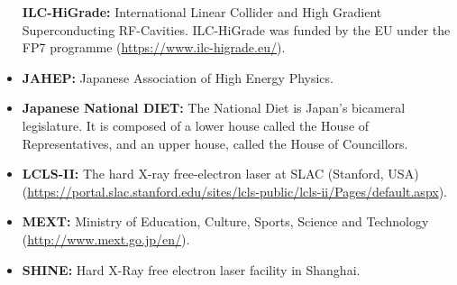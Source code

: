 \documentclass[%
 reprint,
 floatfix,
 amsmath,amssymb,
 aps,
]{revtex4-1}
\begin{document}
\begin{itemize}
\textbf{ILC-HiGrade:} International Linear Collider and High Gradient Superconducting RF-Cavities. ILC-HiGrade was funded by the EU under the FP7 programme (\url{https://www.ilc-higrade.eu/}).
\item
\textbf{JAHEP:} Japanese Association of High Energy Physics.
\item
\textbf{Japanese National DIET:} The National Diet is Japan's bicameral legislature. It is composed of a lower house called the House of Representatives, and an upper house, called the House of Councillors.
\item
\textbf{LCLS-II:}  The hard X-ray free-electron laser at SLAC (Stanford, USA)(\url{https://portal.slac.stanford.edu/sites/lcls-public/lcls-ii/Pages/default.aspx}).
\item
\textbf{MEXT:} Ministry of Education, Culture, Sports, Science and Technology (\url{http://www.mext.go.jp/en/}).
\item
\textbf{SHINE:} Hard X-Ray free electron laser facility in Shanghai.

\end{itemize}
\end{document}
